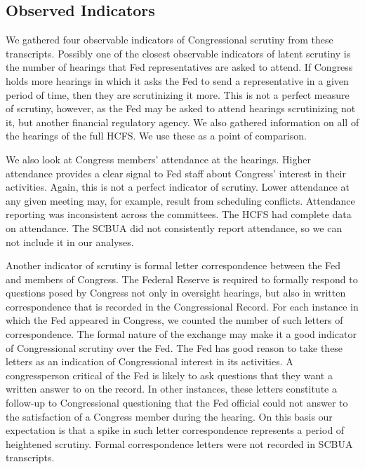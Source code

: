 \documentclass[a4paper]{article}\usepackage[]{graphicx}\usepackage[]{color}
\begin{document}
\subsection{Observed Indicators}

We gathered four observable indicators of Congressional scrutiny from these transcripts. Possibly one of the closest observable indicators of latent scrutiny is the number of hearings that Fed representatives are asked to attend. If Congress holds more hearings in which it asks the Fed to send a representative in a given period of time, then they are scrutinizing it more. This is not a perfect measure of scrutiny, however, as the Fed may be asked to attend hearings scrutinizing not it, but another financial regulatory agency. We also gathered information on all of the hearings of the full HCFS. We use these as a point of comparison.

We also look at Congress members' attendance at the hearings. Higher attendance provides a clear signal to Fed staff about Congress' interest in their activities. Again, this is not a perfect indicator of scrutiny. Lower attendance at any given meeting may, for example, result from scheduling conflicts. Attendance reporting was inconsistent across the committees. The HCFS had complete data on attendance. The SCBUA did not consistently report attendance, so we can not include it in our analyses.

Another indicator of scrutiny is formal letter correspondence between the Fed and members of Congress. The Federal Reserve is required to formally respond to questions posed by Congress not only in oversight hearings, but also in written correspondence that is recorded  in the Congressional Record. For each instance in which the Fed appeared in Congress, we counted the number of such letters of correspondence. The formal nature of the exchange may make it a good indicator of Congressional scrutiny over the Fed. The Fed has good reason to take these letters as an indication of Congressional interest in its activities. A congressperson critical of the Fed is likely to ask questions that they want a written answer to on the record. In other instances, these letters constitute a follow-up to Congressional questioning that the Fed official could not answer to the satisfaction of a Congress member during the hearing. On this basis our expectation is that a spike in such letter correspondence represents a period of heightened scrutiny. Formal correspondence letters were not recorded in SCBUA transcripts.
\end{document}
